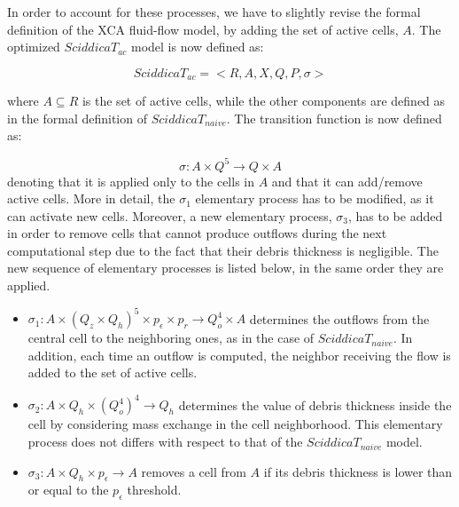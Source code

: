 In order to account for these processes, we have to slightly
revise the formal definition of the XCA fluid-flow model, by
adding the set of active cells, $A$. The optimized
$SciddicaT_{ac}$ model is now defined as:

$$SciddicaT_{ac} = < R, A, X, Q , P, \sigma >$$

\noindent where $A \subseteq R$ is the set of active cells, while
the other components are defined as in the formal definition of
$SciddicaT_{naive}$. The transition function is now defined as:

$$\sigma : A \times Q^5 \rightarrow Q \times A$$ denoting that it
is applied only to the cells in $A$ and that it can add/remove
active cells. More in detail, the $\sigma_1$ elementary process
has to be modified, as it can activate new cells. Moreover, a new
elementary process, $\sigma_3$, has to be added in order to remove
cells that cannot produce outflows during the next computational
step due to the fact that their debris thickness is
negligible. The new sequence of elementary processes is listed
below, in the same order they are applied.

\begin{itemize}
	\item $\sigma_1 : A \times (Q_z \times Q_h)^5 \times p_\epsilon
	\times p_r \rightarrow Q_o^4 \times A$ determines the outflows
	from the central cell to the neighboring ones, as in the case of
	$SciddicaT_{naive}$. In addition, each time an outflow is
	computed, the neighbor receiving the flow is added to the set of
	active cells.
	
	\item $\sigma_2: A \times Q_h \times (Q_o^4)^4 \rightarrow Q_h$
	determines the value of debris thickness inside the cell by
	considering mass exchange in the cell neighborhood. This
	elementary process does not differs with respect to that of the
	$SciddicaT_{naive}$ model.
	
	\item $\sigma_3: A \times Q_h \times p_\epsilon \rightarrow A$
	removes a cell from $A$ if its debris thickness is lower than or
	equal to the $p_\epsilon$ threshold.
\end{itemize}

